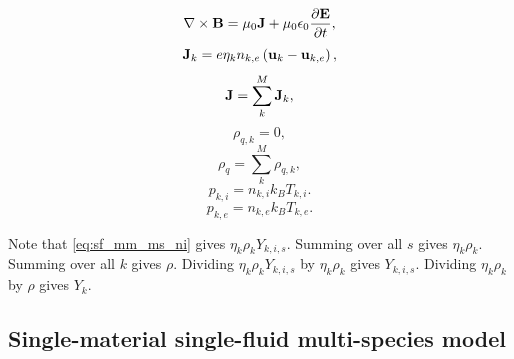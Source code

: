 \documentclass[a4paper,11pt]{report}
\begin{document}
\begin{equation}
    \label{eq:sf_mm_ms_maxwell_2}
    \nabla \times \mathbf{B} = \mu_0 \mathbf{J} + \mu_0 \epsilon_0 \frac{\partial \mathbf{E}}{\partial t},
\end{equation}
\begin{equation}
    \label{eq:sf_mm_ms_curr_density}
    \mathbf{J}_k = e \eta_k n_{k,e} \left( \mathbf{u}_k - \mathbf{u}_{k,e} \right),
\end{equation}
\begin{equation}
    \mathbf{J} = \sum_k^M \mathbf{J}_k,
\end{equation}
\begin{equation}
    \label{eq:sf_mm_ms_mass_density}
    \rho_{q,k} = 0,
\end{equation}
\begin{equation}
    \rho_q = \sum_k^M \rho_{q,k},
\end{equation}
\begin{equation}
    \label{eq:sf_mm_ms_eos_ion}
    p_{k,i} = n_{k,i} k_B T_{k,i}.
\end{equation}
\begin{equation}
    \label{eq:sf_mm_ms_eos_elec}
    p_{k,e} = n_{k,e} k_B T_{k,e}.
\end{equation}

Note that \cref{eq:sf_mm_ms_ni} gives $\eta_k \rho_k Y_{k,i,s}$. Summing over all $s$ gives $\eta_k \rho_k$. Summing over all $k$ gives $\rho$. Dividing $\eta_k \rho_k Y_{k,i,s}$ by $\eta_k \rho_k$ gives $Y_{k,i,s}$. Dividing $\eta_k \rho_k$ by $\rho$ gives $Y_k$.

\subsection{Single-material single-fluid multi-species model}
\label{sec:sf_sm_ms}
\end{document}
